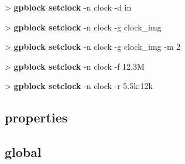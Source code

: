 \documentclass[10pt,a4paper]{article}
\begin{document}
\begin{sampletitle}
> \textbf{gpblock setclock} -n clock -d in
\end{sampletitle}

\begin{sampletitle}
> \textbf{gpblock setclock} -n clock -g clock\_img
\end{sampletitle}

\begin{sampletitle}
> \textbf{gpblock setclock} -n clock -g clock\_img -m 2
\end{sampletitle}

\begin{sampletitle}
> \textbf{gpblock setclock} -n clock -f 12.3M
\end{sampletitle}

\begin{sampletitle}
> \textbf{gpblock setclock} -n clock -r 5.5k:12k
\end{sampletitle}

\subsection{properties}
\subsection{global}
\end{document}
